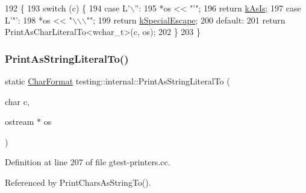 \begin{DoxyCode}
192                                                                  \{
193   \textcolor{keywordflow}{switch} (c) \{
194     \textcolor{keywordflow}{case} L\textcolor{charliteral}{'\(\backslash\)''}:
195       *os << \textcolor{stringliteral}{"'"};
196       \textcolor{keywordflow}{return} \hyperlink{namespacetesting_1_1internal_ae2ef98247c76a50cdc80ceb4a6c81793af7038866be92e9978360b831e376ffaa}{kAsIs};
197     \textcolor{keywordflow}{case} L\textcolor{charliteral}{'"'}:
198       *os << \textcolor{stringliteral}{"\(\backslash\)\(\backslash\)\(\backslash\)""};
199       \textcolor{keywordflow}{return} \hyperlink{namespacetesting_1_1internal_ae2ef98247c76a50cdc80ceb4a6c81793ae1211108e9f35f891d9951da64794d03}{kSpecialEscape};
200     \textcolor{keywordflow}{default}:
201       \textcolor{keywordflow}{return} PrintAsCharLiteralTo<wchar\_t>(c, os);
202   \}
203 \}
\end{DoxyCode}
\mbox{\label{namespacetesting_1_1internal_a82e5b3cf45fd9c4603dbe14bc4cb38c2}} 
\subsubsection{\texorpdfstring{Print\+As\+String\+Literal\+To()}{PrintAsStringLiteralTo()}\hspace{0.1cm}{\footnotesize\ttfamily [2/2]}}
{\footnotesize\ttfamily static \hyperlink{namespacetesting_1_1internal_ae2ef98247c76a50cdc80ceb4a6c81793}{Char\+Format} testing\+::internal\+::\+Print\+As\+String\+Literal\+To (\begin{DoxyParamCaption}\item[{char}]{c,  }\item[{ostream $\ast$}]{os }\end{DoxyParamCaption})\hspace{0.3cm}{\ttfamily [static]}}



Definition at line 207 of file gtest-\/printers.\+cc.



Referenced by Print\+Chars\+As\+String\+To().


